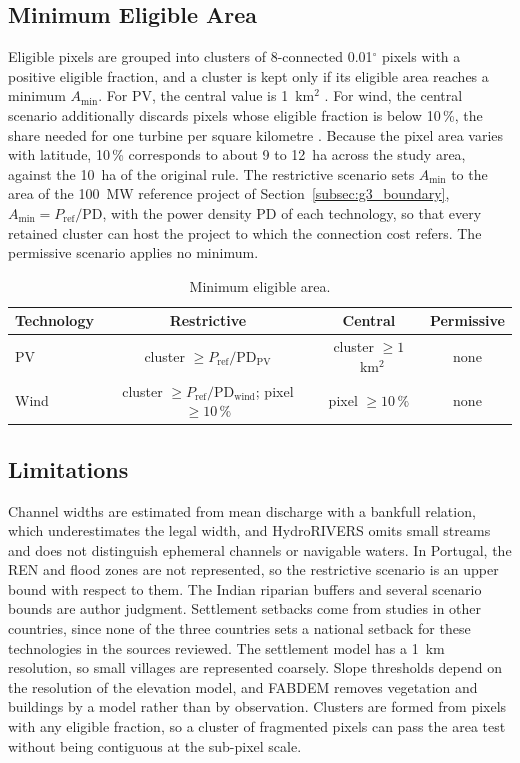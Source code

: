 \subsection{Minimum Eligible Area}
\label{subsec:g6_minarea}

Eligible pixels are grouped into clusters of 8-connected 0.01$^\circ$
pixels with a positive eligible fraction, and a cluster is kept only if
its eligible area reaches a minimum $A_{\min}$. For PV, the central value
is 1~km$^2$ \cite{lopez2012}. For wind, the central scenario additionally
discards pixels whose eligible fraction is below 10\,\%, the share needed
for one turbine per square kilometre \cite{elsner2023onshore}. Because
the pixel area varies with latitude, 10\,\% corresponds to about 9 to
12~ha across the study area, against the 10~ha of the original rule. The
restrictive scenario sets $A_{\min}$ to the area of the 100~MW reference
project of Section~\ref{subsec:g3_boundary}, $A_{\min} =
P_{\mathrm{ref}}/\mathrm{PD}$, with the power density PD of each
technology, so that every retained cluster can host the project to which
the connection cost refers. The permissive scenario applies no minimum.

\begin{table}[htbp]
    \centering
    \caption{Minimum eligible area.}
    \label{tab:g6_minarea}
    \small
    \begin{tabular}{lccc}
        \toprule
        Technology & Restrictive & Central & Permissive \\
        \midrule
        PV   & cluster $\ge P_{\mathrm{ref}}/\mathrm{PD}_{\mathrm{PV}}$
             & cluster $\ge 1$~km$^2$ & none \\
        Wind & cluster $\ge P_{\mathrm{ref}}/\mathrm{PD}_{\mathrm{wind}}$; pixel $\ge 10\,\%$
             & pixel $\ge 10\,\%$ & none \\
        \bottomrule
    \end{tabular}
\end{table}

\subsection{Limitations}
\label{subsec:g6_limitations}

Channel widths are estimated from mean discharge with a bankfull
relation, which underestimates the legal width, and HydroRIVERS omits
small streams and does not distinguish ephemeral channels or navigable
waters. In Portugal, the REN and flood zones are not represented, so the
restrictive scenario is an upper bound with respect to them. The Indian
riparian buffers and several scenario bounds are author judgment. Settlement setbacks come from studies in other
countries, since none of the three countries sets a national setback for
these technologies in the sources reviewed. The settlement model has a
1~km resolution, so small villages are represented coarsely. Slope
thresholds depend on the resolution of the elevation model, and FABDEM
removes vegetation and buildings by a model rather than by observation. Clusters are
formed from pixels with any eligible fraction, so a cluster of
fragmented pixels can pass the area test without being contiguous at the
sub-pixel scale.